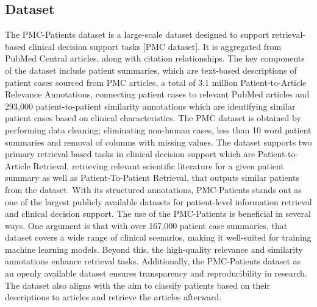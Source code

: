 \subsection{Dataset}
The PMC-Patients dataset is a large-scale dataset designed to support retrieval-based clinical decision support tasks [PMC dataset]. It is aggregated from PubMed Central articles, along with citation relationships. The key components of the dataset include patient summaries, which are text-based descriptions of patient cases sourced from PMC articles, a total of 3.1 million Patient-to-Article Relevance Annotations, connecting patient cases to relevant PubMed articles and 293,000 patient-to-patient similarity annotations which are identifying similar patient cases based on clinical characteristics. The PMC dataset is obtained by performing data cleaning; eliminating non-human cases, less than 10 word patient summaries and removal of columns with missing values. The dataset supports two primary retrieval based tasks in clinical decision support which are Patient-to-Article Retrieval, retrieving relevant scientific literature for a given patient summary as well as Patient-To-Patient Retrieval, that outputs similar patients from the dataset. 
With its structured annotations, PMC-Patients stands out as one of the largest publicly available datasets for patient-level information retrieval and clinical decision support.
The use of the PMC-Patients is beneficial in several ways. One argument is that with over 167,000 patient case summaries, that dataset covers a wide range of clinical scenarios, making it well-suited for training machine learning models. Beyond this, the high-quality relevance and similarity annotations enhance retrieval tasks. Additionally, the PMC-Patients dataset as an openly available dataset ensures transparency and reproducibility in research. The dataset also aligns with the aim to classify patients based on their descriptions to articles and retrieve the articles afterward.

